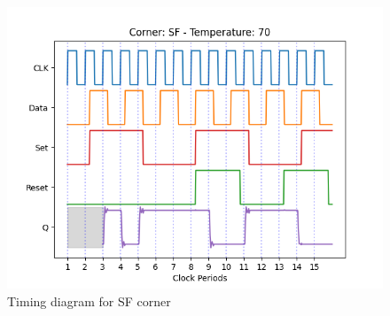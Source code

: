 \begin{figure}[H]
    \centering
    \begin{minipage}{0.5\textwidth}
        \centering
        \includegraphics[width=\textwidth]{Figures/Aimspice_Plots/SF_70.png}
        \caption{Timing diagram for SF corner}
        \label{fig:SF70}
    \end{minipage}%
\end{figure}

